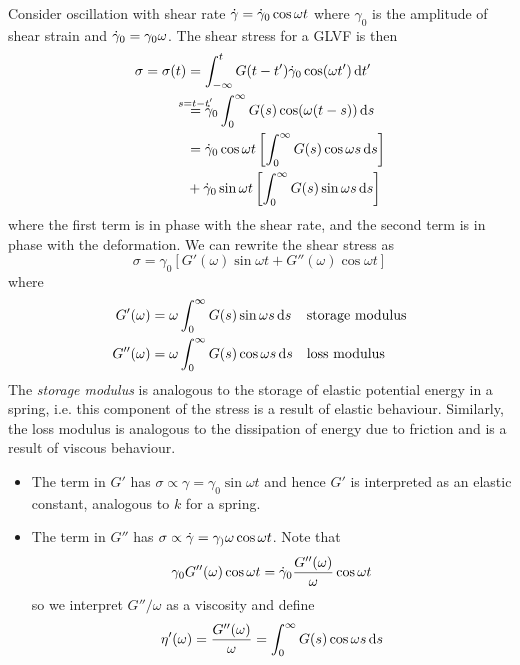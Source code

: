 \documentclass{jknotes}
\begin{document}
Consider oscillation with shear rate $\dot{\gamma} = \dot{\gamma}_0 \cos \omega t$ where
$\gamma_0$ is the amplitude of shear strain and $\dot{\gamma}_0 = \gamma_0 \omega$.
The shear stress for a GLVF is then
\begin{align}
	\sigma = \sigma(t) &= \int_{-\infty}^t G(t-t') \srate_0 \cos (\omega t' )\,
			\diffd t' \\
			&\stackrel{\mathmakebox[\widthof{=}]{s=t-t'}}{=}\srate_0 \int_0^\infty G(s) \cos
			(\omega(t-s)) \,
			\diffd s \\
			&= \srate_0 \cos \omega t \left[ \int_0^\infty G(s) \cos \omega s
		\, \diffd s \right] \\
		&+ \srate_0 \sin \omega t \left[ \int_0^\infty G(s) \sin \omega s
	\,\diffd s \right]
\end{align}
where the first term is in phase with the shear rate, and the second term is
in phase with the deformation. We can rewrite the shear stress as
\begin{equation}
	\sigma = \gamma_0 \left[ G'(\omega) \sin \omega t + G''(\omega) \cos
	\omega t \right]
\end{equation}
where
\begin{align}
	G'(\omega) &= \omega \int_0^\infty G(s) \sin \omega s \, \diffd s
						   &&\text{storage modulus} \\
	G''(\omega) &= \omega \int_0^\infty G(s) \cos \omega s \, \diffd s
							   &&\text{loss modulus}
\end{align}
The \emph{storage modulus} is analogous to the storage of elastic potential
energy in a spring, i.e. this component of the stress is a result of elastic
behaviour. Similarly, the loss modulus is analogous to the dissipation of
energy due to friction and is a result of viscous behaviour. 
\begin{itemize}
	\item The term in $G'$ has $\sigma \propto \gamma = \gamma_0 \sin \omega
		t$ and hence $G'$ is interpreted as an elastic constant, analogous to
		$k$ for a spring. 
	\item The term in $G''$ has $\sigma \propto \dot{\gamma} = \gamma_) \omega \cos
		\omega t$. Note that
		\begin{equation}
			\gamma_0 G''(\omega) \cos \omega t = \dot{\gamma}_0
			\frac{G''(\omega)}{\omega} \cos \omega t
		\end{equation}
		so we interpret $G''/\omega$ as a viscosity and define 
		\begin{equation}
			\eta'(\omega) = \frac{G''(\omega)}{\omega} = \int_0^\infty G(s)
			\cos \omega s \, \diffd s
		\end{equation}
\end{itemize}
\end{document}
